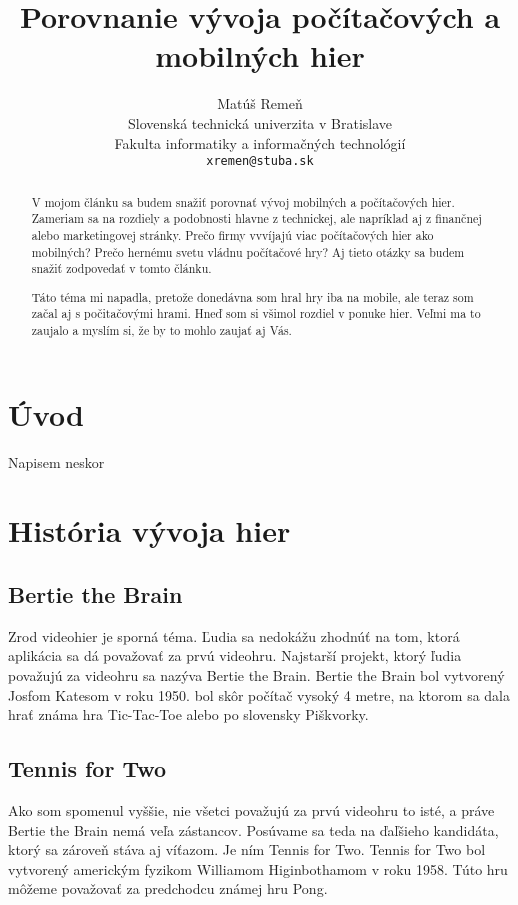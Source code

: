 \documentclass[10pt,twoside,slovak,a4paper]{article}
\title{Porovnanie vývoja počítačových a mobilných hier}
\author{Matúš Remeň\\[2pt]
	{\small Slovenská technická univerzita v Bratislave}\\
	{\small Fakulta informatiky a informačných technológií}\\
	{\small \texttt{xremen@stuba.sk}}
	}
\date{\small              }
\begin{document}
\maketitle

\begin{abstract}
V mojom článku sa budem snažiť porovnať vývoj mobilných a počítačových hier. Zameriam sa na rozdiely a podobnosti hlavne z technickej, ale napríklad aj z finančnej alebo marketingovej stránky. Prečo firmy vvvíjajú viac počítačových hier ako mobilných? Prečo hernému svetu vládnu počítačové hry? Aj tieto otázky sa budem snažiť zodpovedať v tomto článku.

Táto téma mi napadla, pretože donedávna som hral hry iba na mobile, ale teraz som začal aj s počitačovými hrami. Hneď som si všimol rozdiel v ponuke hier. Veľmi ma to zaujalo  a myslím si, že by to mohlo zaujať aj Vás.
\end{abstract}



\section{Úvod}

Napisem neskor

\section{História vývoja hier} \label{historia} 

\subsection{Bertie the Brain} \label{historia:bertie}
Zrod videohier je sporná téma. Ľudia sa nedokážu zhodnúť na tom, ktorá aplikácia sa dá považovať za prvú videohru. Najstarší projekt, ktorý ľudia považujú za videohru sa nazýva Bertie the Brain. Bertie the Brain bol vytvorený Josfom Katesom v roku 1950. bol skôr počítač vysoký 4 metre, na ktorom sa dala hrať známa hra Tic-Tac-Toe alebo po slovensky Piškvorky.

\subsection{Tennis for Two} \label{historia:tennis}
Ako som spomenul vyššie, nie všetci považujú za prvú videohru to isté, a práve Bertie the Brain nemá veľa zástancov. Posúvame sa teda na ďaľšieho kandidáta, ktorý sa zároveň stáva aj víťazom. Je ním Tennis for Two. Tennis for Two bol vytvorený americkým fyzikom Williamom Higinbothamom v roku 1958. Túto hru môžeme považovať za predchodcu známej hru Pong.
\end{document}
